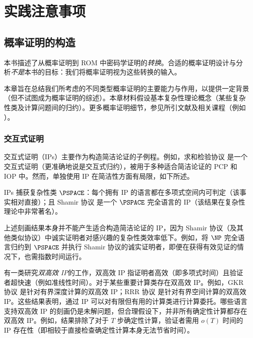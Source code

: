 \documentclass[american,singlepageview]{snargs-book-zh}
\begin{document}
\part{实践注意事项}
\label{part:practical-considerations}


\chapter{概率证明的构造}
\label{chapter:constructions-of-probabilistic-proofs}

本书描述了从概率证明到 ROM 中密码学证明的\emph{转换}。合适的概率证明设计与分析\emph{不是}本书的目标：我们将概率证明视为这些转换的输入。

本章旨在总结我们所考虑的不同类型概率证明的主要能力与作用，以提供一定背景（但不试图成为概率证明的综述）。本章材料假设基本复杂性理论概念（某些复杂性类及计算问题间的归约）。更多概率证明细节，参见所引文献及相关课程（例如 \cite{FOPPSummer21,FOPPSummer23}）。

\section{交互式证明}
\label{section:known-ips}

交互式证明（IPs）主要作为构造简洁论证的子例程。例如，求和检验协议 \cite{LundFKN92} 是一个交互式证明（更准确地说是交互式归约），被用于多种适合简洁论证的 PCP 和 IOP 中。然而，单独使用 IP 在简洁性方面有局限，如下所述。

IPs 捕获复杂性类 $\PSPACE$：每个拥有 IP 的语言都在多项式空间内可判定（该事实相对直接）；且 Shamir 协议 \cite{Shamir92} 是一个 $\PSPACE$ 完全语言的 IP（该结果在复杂性理论中非常著名）。

上述刻画结果本身并不能产生适合构造简洁论证的 IP，因为 Shamir 协议（及其他类似协议）中诚实证明者对感兴趣的复杂性类效率低下。例如，将 $\NP$ 完全语言归约到 $\PSPACE$ 并执行 Shamir 协议的诚实证明者，即便在获得有效见证的情况下，也需指数时间运行。

有一类研究\emph{双高效 IP}的工作，双高效 IP 指证明者高效（即多项式时间）且验证者超快速（例如准线性时间）。对于某些重要计算类存在双高效 IP。例如，GKR 协议 \cite{GoldwasserKR15} 是针对有界深度计算的双高效 IP；RRR 协议 \cite{ReingoldRR21} 是针对有界空间计算的双高效 IP。这些结果表明，通过 IP 可以对有限但有用的计算类进行计算委托。哪些语言支持双高效 IP 的刻画仍是未解问题，但合理假设下，并非所有确定性计算都存在双高效 IP。例如，结果排除了对于 $T$ 步确定性计算，验证者需用 $o(T)$ 时间的 IP 存在性（即相较于直接检查确定性计算本身无法节省时间）。
\end{document}
